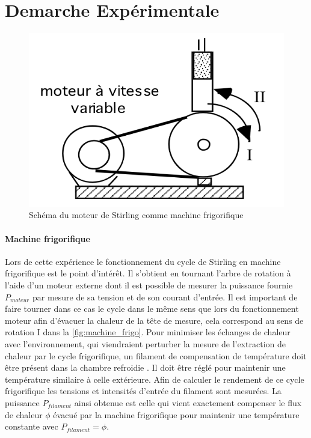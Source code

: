 \section{Demarche Expérimentale}






\begin{minipage}{\linewidth}
    \begin{figure}
        \includegraphics[width=\linewidth]{figures/machine-frigo.png}
        \caption{Schéma du moteur de Stirling comme machine frigorifique \cite{notice}}
        \label{fig:machine_frigo}
    \end{figure}

    \paragraph*{Machine frigorifique}
    Lors de cette expérience le fonctionnement du cycle de Stirling en machine frigorifique est le point d'intérêt. Il s'obtient en tournant l'arbre de rotation à l'aide d'un moteur externe dont il est possible de mesurer la puissance fournie \(P_{moteur}\) par mesure de sa tension et de son courant d'entrée. Il est important de faire tourner dans ce cas le cycle dans le même sens que lors du fonctionnement moteur afin d'évacuer la chaleur de la tête de mesure, cela correspond au sens de rotation I dans la \autoref{fig:machine_frigo}. Pour minimiser les échanges de chaleur avec l'environnement, qui viendraient perturber la mesure de l'extraction de chaleur par le cycle frigorifique, un filament de compensation de température doit être présent dans la chambre refroidie \cite{notice}. Il doit être réglé pour maintenir une température similaire à celle extérieure. Afin de calculer le rendement de ce cycle frigorifique les tensions et intensités d'entrée du filament sont mesurées. La puissance \(P_{filament}\) ainsi obtenue est celle qui vient exactement compenser le flux de chaleur \(\phi\) évacué par la machine frigorifique pour maintenir une température constante avec \(P_{filament} = \phi\).
\end{minipage}

